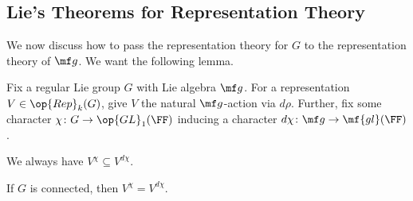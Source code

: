 \documentclass[../notes.tex]{subfiles}
\begin{document}
\subsection{Lie's Theorems for Representation Theory}
We now discuss how to pass the representation theory for $G$ to the representation theory of $\mf g$. We want the following lemma.
\begin{lemma} \label{lem:invariants-lie-group-algebra}
	Fix a regular Lie group $G$ with Lie algebra $\mf g$. For a representation $V\in\op{Rep}_k(G)$, give $V$ the natural $\mf g$-action via $d\rho$. Further, fix some character $\chi\colon G\to\op{GL}_1(\FF)$ inducing a character $d\chi\colon\mf g\to\mf{gl}(\FF)$.
	\begin{listalph}
		\item We always have $V^\chi\subseteq V^{d\chi}$.
		\item If $G$ is connected, then $V^\chi=V^{d\chi}$.
	\end{listalph}
\end{lemma}
\end{document}
